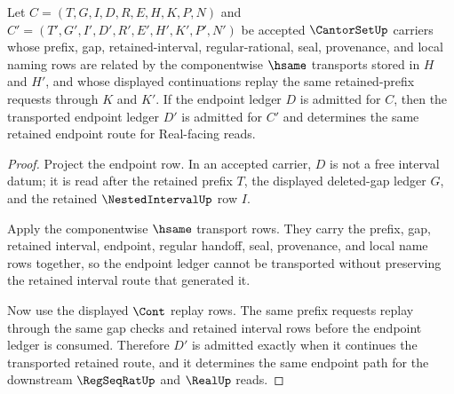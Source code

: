 \begin{theorem}
\label{thm:cantor-set-endpoint-ledger-stability}
Let $C=(T,G,I,D,R,E,H,K,P,N)$ and $C'=(T',G',I',D',R',E',H',K',P',N')$ be accepted $\CantorSetUp$ carriers whose prefix, gap, retained-interval, regular-rational, seal, provenance, and local naming rows are related by the componentwise $\hsame$ transports stored in $H$ and $H'$, and whose displayed continuations replay the same retained-prefix requests through $K$ and $K'$. If the endpoint ledger $D$ is admitted for $C$, then the transported endpoint ledger $D'$ is admitted for $C'$ and determines the same retained endpoint route for Real-facing reads.
\end{theorem}
\begin{proof}
Project the endpoint row. In an accepted carrier, $D$ is not a free interval datum; it is read after the retained prefix $T$, the displayed deleted-gap ledger $G$, and the retained $\NestedIntervalUp$ row $I$.

Apply the componentwise $\hsame$ transport rows. They carry the prefix, gap, retained interval, endpoint, regular handoff, seal, provenance, and local name rows together, so the endpoint ledger cannot be transported without preserving the retained interval route that generated it.

Now use the displayed $\Cont$ replay rows. The same prefix requests replay through the same gap checks and retained interval rows before the endpoint ledger is consumed. Therefore $D'$ is admitted exactly when it continues the transported retained route, and it determines the same endpoint path for the downstream $\RegSeqRatUp$ and $\RealUp$ reads.
\end{proof}

